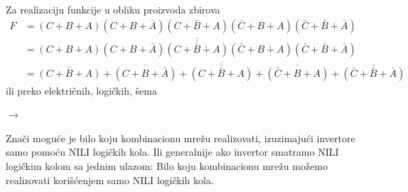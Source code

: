 \begin{frame}[label=02-s026]
\gusttekst
\setlength{\abovedisplayskip}{3pt}\setlength{\belowdisplayskip}{3pt}
Za realizaciju funkcije u obliku proizvoda zbirova
\[
\begin{aligned}
F&=(C+B+A)(C+B+\bar A)(C+\bar B+A)(\bar C+B+A)(\bar C+\bar B+\bar A)\\
&=\overline{\overline{(C+B+A)(C+B+\bar A)(C+\bar B+A)(\bar C+B+A)(\bar C+\bar B+\bar A)}}\\
&=\overline{\overline{(C+B+A)}+\overline{(C+B+\bar A)}+\overline{(C+\bar B+A)}+\overline{(\bar C+B+A)}+\overline{(\bar C+\bar B+\bar A)}}
\end{aligned}
\]
ili preko električnih, logičkih, šema

\centering

\(\longrightarrow\)
\par
\raggedright
Znači moguće je bilo koju kombinacionu mrežu realizovati, izuzimajući invertore samo pomoću NILI logičkih kola. Ili generalnije ako invertor smatramo NILI logičkim kolom sa jednim ulazom: Bilo koju kombinacionu mrežu možemo realizovati korišćenjem samo NILI logičkih kola.
\end{frame}
